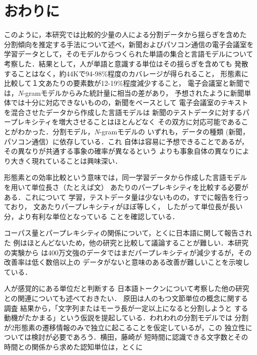 \section{おわりに}
  このように，本研究では比較的少量の人による分割データから揺らぎを含めた
分割傾向を推定する手法について述べ，新聞およびパソコン通信の電子会議室を
学習データとして，そのモデルからつくられた単語の集合と言語モデルについて
考察した．結果として，人が単語と意識する単位はその揺らぎを含めても
発散することはなく，約\hspace{-0.05mm}44K\hspace{-0.05mm}で\hspace{-0.05mm}94-98\%\hspace{-0.05mm}\mbox{程度のカバレージが}得られること，
形態素に比較して１文あたりの要素数が12-19\%程度減少すること，
電子会議室と新聞では，{\it N}-gramモデルからみた統計量に相当の差があり，
予想されたように新聞単体では十分に対応できないものの，新聞をベースとして
電子会議室のテキストを混合させたデータから作成した言語モデルは
新聞のテストデータに対するパープレキシティを増大させることはほとんどなく
その双方に対応可能であることがわかった．分割モデル，{\it N}-gramモデルの
いずれも，データの種類 (新聞，パソコン通信）に依存している．これ
自体は容易に予想できることであるが，その異なりが共通する事象の確率が異なるという
よりも事象自体の異なりにより大きく現れていることは興味深い．
\par
形態素との効率比較という意味では，同一学習データから作成した言語モデル
を用いて単位長さ（たとえば文）
あたりのパープレキシティを比較する必要がある．これについて
学習，テストデータ量は少ないものの，すでに報告を行っており，
文あたりパープレキシティがほぼ等しく，
したがって単位長が長い分，より有利な単位となっている
ことを確認している\cite{NISIMURA4}．
\par
  コーパス量とパープレキシティの関係について，とくに日本語に関して報告された
例はほとんどないため，他の研究と比較して議論することが難しい．本研究の実験から
は400万文強のデータではまだパープレキシティが減少するが，その改善率は低く数倍以上の
データがないと意味のある改善が難しいことを示唆している．
\par
人が感覚的にある単位だと判断する
日本語トークンについて考察した他の研究との関連についても述べておきたい．
原田\cite{HARADA}は人のもつ文節単位の概念に関する調査
結果から，「文字列またはモーラ長が一定以上になると分割しようと
する動機がたかまる」という仮説を提起している．われわれの分割モデルでは
分割が2形態素の遷移情報のみで独立に起こることを仮定しているが，この
独立性については検討が必要であろう．横田，藤崎\cite{YOKOTA}が
短時間に認識できる文字数とその時間との関係から求めた認知単位は，とくに
